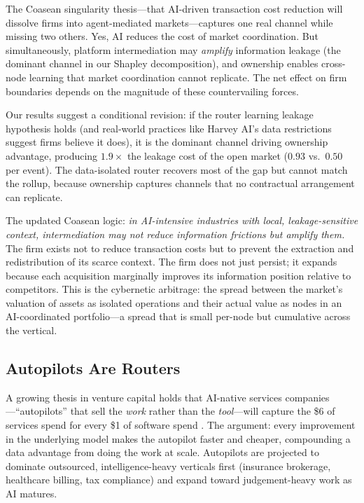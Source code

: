 \documentclass[12pt]{article}
\theoremstyle{definition}
\begin{document}
The Coasean singularity thesis---that AI-driven transaction cost reduction will dissolve firms into agent-mediated markets---captures one real channel while missing two others. Yes, AI reduces the cost of market coordination. But simultaneously, platform intermediation may \textit{amplify} information leakage (the dominant channel in our Shapley decomposition), and ownership enables cross-node learning that market coordination cannot replicate. The net effect on firm boundaries depends on the magnitude of these countervailing forces.

Our results suggest a conditional revision: if the router learning leakage hypothesis holds (and real-world practices like Harvey AI's data restrictions suggest firms believe it does), it is the dominant channel driving ownership advantage, producing $1.9\times$ the leakage cost of the open market ($0.93$ vs.\ $0.50$ per event). The data-isolated router recovers most of the gap but cannot match the rollup, because ownership captures channels that no contractual arrangement can replicate.

The updated Coasean logic: \textit{in AI-intensive industries with local, leakage-sensitive context, intermediation may not reduce information frictions but amplify them.} The firm exists not to reduce transaction costs but to prevent the extraction and redistribution of its scarce context. The firm does not just persist; it expands because each acquisition marginally improves its information position relative to competitors. This is the cybernetic arbitrage: the spread between the market's valuation of assets as isolated operations and their actual value as nodes in an AI-coordinated portfolio---a spread that is small per-node but cumulative across the vertical.

\subsection{Autopilots Are Routers}

A growing thesis in venture capital holds that AI-native services companies---``autopilots'' that sell the \textit{work} rather than the \textit{tool}---will capture the \$6 of services spend for every \$1 of software spend \citep{sequoia2025services}. The argument: every improvement in the underlying model makes the autopilot faster and cheaper, compounding a data advantage from doing the work at scale. Autopilots are projected to dominate outsourced, intelligence-heavy verticals first (insurance brokerage, healthcare billing, tax compliance) and expand toward judgement-heavy work as AI matures.
\end{document}
